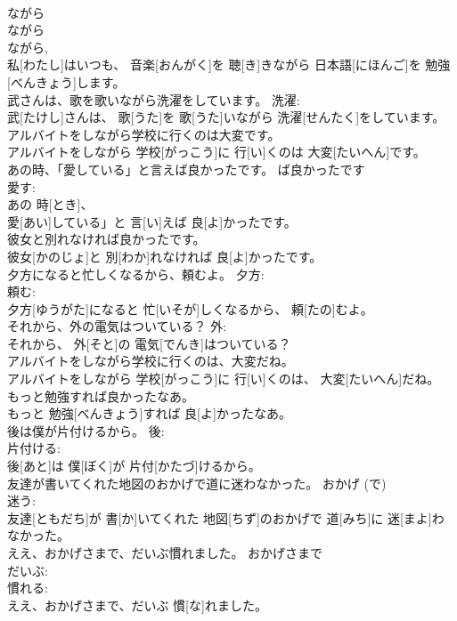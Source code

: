 \documentclass[8pt]{extreport}
\begin{document}
\begin{CJK}{UTF8}{min}
\\	ながら 
\\	ながら 
\\	ながら, 
\\	私[わたし]はいつも、 音楽[おんがく]を 聴[き]きながら 日本語[にほんご]を 勉強[べんきょう]します。	
\\	武さんは、歌を歌いながら洗濯をしています。	洗濯: 
\\	武[たけし]さんは、 歌[うた]を 歌[うた]いながら 洗濯[せんたく]をしています。	
\\	アルバイトをしながら学校に行くのは大変です。	
\\	アルバイトをしながら 学校[がっこう]に 行[い]くのは 大変[たいへん]です。	
\\	あの時、「愛している」と言えば良かったです。	ば良かったです 
\\	愛す: 
\\	あの 時[とき]、
\\	愛[あい]している」と 言[い]えば 良[よ]かったです。	
\\	彼女と別れなければ良かったです。	
\\	彼女[かのじょ]と 別[わか]れなければ 良[よ]かったです。	
\\	夕方になると忙しくなるから、頼むよ。	夕方: 
\\	頼む: 
\\	夕方[ゆうがた]になると 忙[いそが]しくなるから、 頼[たの]むよ。	
\\	それから、外の電気はついている？	外: 
\\	それから、 外[そと]の 電気[でんき]はついている？	
\\	アルバイトをしながら学校に行くのは、大変だね。	
\\	アルバイトをしながら 学校[がっこう]に 行[い]くのは、 大変[たいへん]だね。	
\\	もっと勉強すれば良かったなあ。	
\\	もっと 勉強[べんきょう]すれば 良[よ]かったなあ。	
\\	後は僕が片付けるから。	後: 
\\	片付ける: 
\\	後[あと]は 僕[ぼく]が 片付[かたづ]けるから。	
\\	友達が書いてくれた地図のおかげで道に迷わなかった。	おかげ (で) 
\\	迷う: 
\\	友達[ともだち]が 書[か]いてくれた 地図[ちず]のおかげで 道[みち]に 迷[まよ]わなかった。	
\\	ええ、おかげさまで、だいぶ慣れました。	おかげさまで 
\\	だいぶ: 
\\	慣れる: 
\\	ええ、おかげさまで、だいぶ 慣[な]れました。	
\end{CJK}
\end{document}

